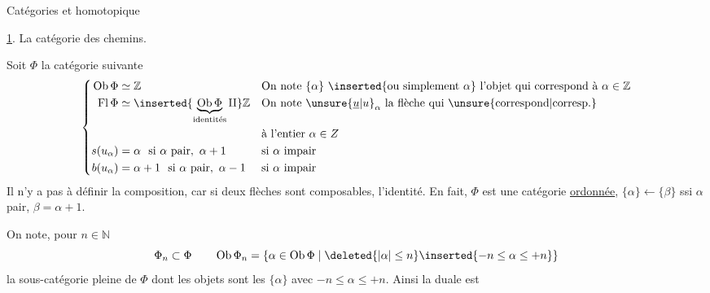 Catégories  et  homotopique

\uline{1}. La catégorie des chemins.

Soit $\Phi$ la catégorie suivante
\[
\left\{\begin{aligned}
\operatorname{Ob}\Phi &\simeq \mathbb Z &&\text{On note }\{\alpha\}\ \inserted{\text{ou simplement }\alpha}\ \text{l'objet qui correspond à }\alpha\in\mathbb Z\\
\operatorname{Fl}\Phi &\simeq \inserted{\underbrace{\operatorname{Ob}\Phi}_{\text{identités}}\amalg}\mathbb Z &&\text{On note }\unsure{\underline{u}|u}_{\alpha}\ \text{la flèche qui \unsure{correspond|corresp.}}\\
&&&\text{à l'entier }\alpha\in Z\\
s(u_\alpha)&=\alpha\ \text{ si }\alpha\text{ pair},\ \alpha+1 &&\text{si }\alpha\text{ impair}\\
b(u_\alpha)&=\alpha+1\ \text{ si }\alpha\text{ pair},\ \alpha-1 &&\text{si }\alpha\text{ impair}
\end{aligned}\right.
\]
Il n'y a pas à définir la composition, car si deux flèches sont composables,  l'identité. En fait, $\Phi$ est une catégorie \uline{ordonnée}, $\{\alpha\}\leftarrow\{\beta\}$ ssi $\alpha$ pair, $\beta=\alpha+1$.

On  note, pour $n\in\mathbb N$
\[
\Phi_n\subset\Phi\qquad \operatorname{Ob}\Phi_n=\{\alpha\in\operatorname{Ob}\Phi\mid\deleted{|\alpha|\leq n}\inserted{-n\leq\alpha\leq+n}\}
\]
la sous-catégorie pleine de $\Phi$ dont les objets sont les $\{\alpha\}$ avec $-n\leq\alpha\leq+n$. Ainsi
la duale est

